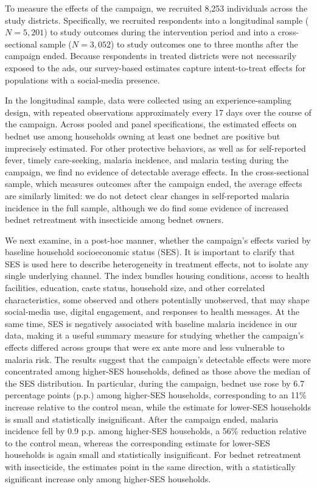 To measure the effects of the campaign, we recruited 8,253 individuals across the study districts. Specifically, we recruited respondents into a longitudinal sample ($N=5{,}201$) to study outcomes during the intervention period and into a cross-sectional sample ($N=3{,}052$) to study outcomes one to three months after the campaign ended. Because respondents in treated districts were not necessarily exposed to the ads, our survey-based estimates capture intent-to-treat effects for populations with a social-media presence.

In the longitudinal sample, data were collected using an experience-sampling design, with repeated observations approximately every 17 days over the course of the campaign. Across pooled and panel specifications, the estimated effects on bednet use among households owning at least one bednet are positive but imprecisely estimated. For other protective behaviors, as well as for self-reported fever, timely care-seeking, malaria incidence, and malaria testing during the campaign, we find no evidence of detectable average effects. In the cross-sectional sample, which measures outcomes after the campaign ended, the average effects are similarly limited: we do not detect clear changes in self-reported malaria incidence in the full sample, although we do find some evidence of increased bednet retreatment with insecticide among bednet owners.


We next examine, in a post-hoc manner, whether the campaign’s effects varied by baseline household socioeconomic status (SES). It is important to clarify that SES is used here to describe heterogeneity in treatment effects, not to isolate any single underlying channel. The index bundles housing conditions, access to health facilities, education, caste status, household size, and other correlated characteristics, some observed and others potentially unobserved, that may shape social-media use, digital engagement, and responses to health messages. At the same time, SES is negatively associated with baseline malaria incidence in our data, making it a useful summary measure for studying whether the campaign’s effects differed across groups that were ex ante more and less vulnerable to malaria risk. The results suggest that the campaign’s detectable effects were more concentrated among higher-SES households, defined as those above the median of the SES distribution. In particular, during the campaign, bednet use rose by 6.7 percentage points (p.p.) among higher-SES households, corresponding to an 11\% increase relative to the control mean, while the estimate for lower-SES households is small and statistically insignificant. After the campaign ended, malaria incidence fell by 0.9 p.p. among higher-SES households, a 56\% reduction relative to the control mean, whereas the corresponding estimate for lower-SES households is again small and statistically insignificant. For bednet retreatment with insecticide, the estimates point in the same direction, with a statistically significant increase only among higher-SES households.


